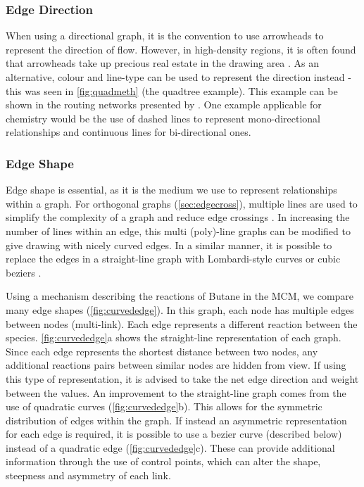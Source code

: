 \subsubsection{Edge Direction}
When using a directional graph, it is the convention to use arrowheads to represent the direction of flow. However, in high-density regions, it is often found that arrowheads take up precious real estate in the drawing area \citep{noarredge}. As an alternative, colour and line-type can be used to represent the direction instead - this was seen in \autoref{fig:quadmeth} (the quadtree example). This example can be shown in the routing networks presented by \citep{networkrouting}. One example applicable for chemistry would be the use of dashed lines to represent mono-directional relationships and continuous lines for bi-directional ones. 








\subsubsection{Edge Shape}
Edge shape is essential, as it is the medium we use to represent relationships within a graph. For orthogonal graphs (\autoref{sec:edgecross}), multiple lines are used to simplify the complexity of a graph and reduce edge crossings \citep{ortho}. In increasing the number of lines within an edge, this multi (poly)-line graphs can be modified to give drawing with nicely curved edges. In a similar manner, it is possible to replace the edges in a straight-line graph with Lombardi-style curves or cubic beziers \citep{lombardi,bezier}. 

Using a mechanism describing the reactions of Butane in the MCM, we compare many edge shapes (\autoref{fig:curvededge}). In this graph, each node has multiple edges between nodes (multi-link). Each edge represents a different reaction between the species. \autoref{fig:curvededge}a shows the straight-line representation of each graph. Since each edge represents the shortest distance between two nodes, any additional reactions pairs between similar nodes are hidden from view. If using this type of representation, it is advised to take the net edge direction and weight between the values. An improvement to the straight-line graph comes from the use of quadratic curves (\autoref{fig:curvededge}b). This allows for the symmetric distribution of edges within the graph. If instead an asymmetric representation for each edge is required, it is possible to use a bezier curve (described below) instead of a quadratic edge (\autoref{fig:curvededge}c). These can provide additional information through the use of control points, which can alter the shape, steepness and asymmetry of each link. 

